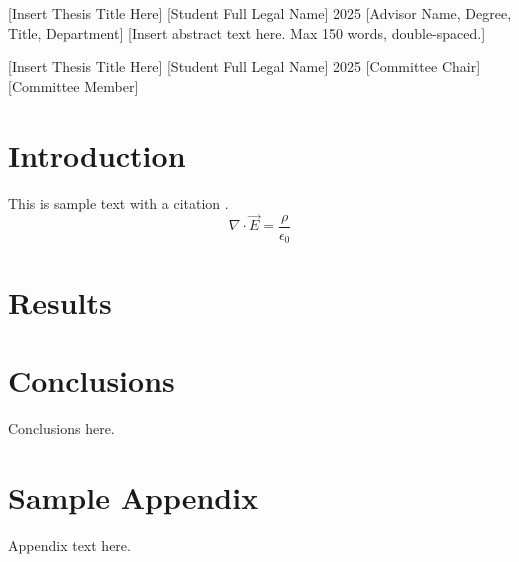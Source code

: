 \documentclass[12pt,oneside]{report}
\begin{document}
\apcsabstract
{[Insert Thesis Title Here]}
{[Student Full Legal Name]}
{2025}
{[Advisor Name, Degree, Title, Department]}
{[Insert abstract text here. Max 150 words, double-spaced.]}

\thesistitlepage
{[Insert Thesis Title Here]}
{[Student Full Legal Name]}
{2025}
{[Committee Chair]}
{[Committee Member]}

\frontmatter
\dedication{[Optional dedication text]}

\tableofcontents
\listoftables
\listoffigures

\mainmatter

\chapter{Introduction}
This is sample text with a citation \cite{einstein1905}.
\begin{equation}
\nabla \cdot \vec{E} = \frac{\rho}{\epsilon_0}
\end{equation}

\chapter{Results}

\chapter{Conclusions}
Conclusions here.

\printbibliography[title={LITERATURE CITED}]
\blankpage

\appendix
\chapter{Sample Appendix}
Appendix text here.
\end{document}
